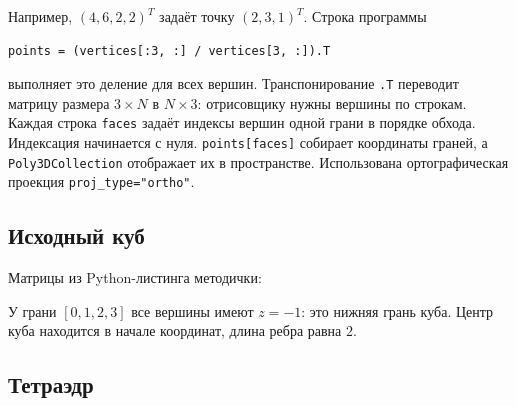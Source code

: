 \documentclass[a4paper,14pt]{extarticle}
\begin{document}
Например, $(4,6,2,2)^T$ задаёт точку $(2,3,1)^T$.
Строка программы

\begin{lstlisting}[style=py,numbers=none]
points = (vertices[:3, :] / vertices[3, :]).T
\end{lstlisting}

выполняет это деление для всех вершин. Транспонирование \texttt{.T} переводит
матрицу размера $3\times N$ в $N\times3$: отрисовщику нужны вершины по строкам.
Каждая строка \texttt{faces} задаёт индексы вершин одной грани в порядке обхода.
Индексация начинается с нуля. \texttt{points[faces]} собирает координаты граней,
а \texttt{Poly3DCollection} отображает их в пространстве.
Использована ортографическая проекция \texttt{proj\_type="ortho"}.

\subsection*{Исходный куб}

Матрицы из Python-листинга методички:

\begin{center}\end{center}

\begin{center}\end{center}

У грани $[0,1,2,3]$ все вершины имеют $z=-1$: это нижняя грань куба.
Центр куба находится в начале координат, длина ребра равна $2$.

\subsection*{Тетраэдр}
\end{document}
